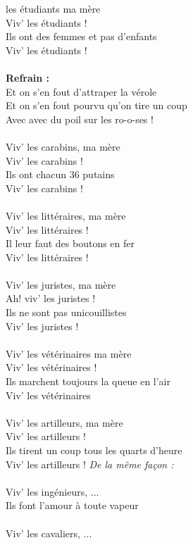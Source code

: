 
 les étudiants ma mère
\\Viv' les étudiants !
\\Ils ont des femmes et pas d'enfants
\\Viv' les étudiants !
\\\\\textbf{Refrain :}
\\Et on s'en fout d'attraper la vérole
\\Et on s'en fout pourvu qu'on tire un coup
\\Avec avec du poil sur les ro-o-ses !
\\\\Viv' les carabins, ma mère
\\Viv' les carabins !
\\Ils ont chacun 36 putains
\\Viv' les carabins !
\\\\Viv' les littéraires, ma mère
\\Viv' les littéraires !
\\Il leur faut des boutons en fer
\\Viv' les littéraires !
\\\\Viv' les juristes, ma mère
\\Ah! viv' les juristes !
\\Ils ne sont pas unicouillistes
\\Viv' les juristes !
\\\\Viv' les vétérinaires ma mère
\\Viv' les vétérinaires !
\\Ils marchent toujours la queue en l'air
\\Viv' les vétérinaires
\\\\Viv' les artilleurs, ma mère
\\Viv' les artilleurs !
\\Ils tirent un coup tous les quarts d'heure
\\Viv' les artilleurs !
\breakpage
\textit{De la même façon :}
\\\\Viv' les ingénieurs, ...
\\Ils font l'amour à toute vapeur
\\\\Viv' les cavaliers, ...

